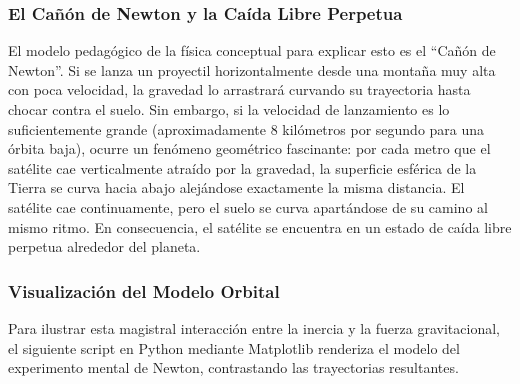 \documentclass[12pt]{article}
\begin{document}
\subsubsection*{El Cañón de Newton y la Caída Libre Perpetua}
El modelo pedagógico de la física conceptual para explicar esto es el ``Cañón de Newton''. Si se lanza un proyectil horizontalmente desde una montaña muy alta con poca velocidad, la gravedad lo arrastrará curvando su trayectoria hasta chocar contra el suelo. 
Sin embargo, si la velocidad de lanzamiento es lo suficientemente grande (aproximadamente 8 kilómetros por segundo para una órbita baja), ocurre un fenómeno geométrico fascinante: por cada metro que el satélite cae verticalmente atraído por la gravedad, la superficie esférica de la Tierra se curva hacia abajo alejándose exactamente la misma distancia. El satélite cae continuamente, pero el suelo se curva apartándose de su camino al mismo ritmo. En consecuencia, el satélite se encuentra en un estado de caída libre perpetua alrededor del planeta.

\subsubsection*{Visualización del Modelo Orbital}
Para ilustrar esta magistral interacción entre la inercia y la fuerza gravitacional, el siguiente script en Python mediante Matplotlib renderiza el modelo del experimento mental de Newton, contrastando las trayectorias resultantes.
\end{document}
